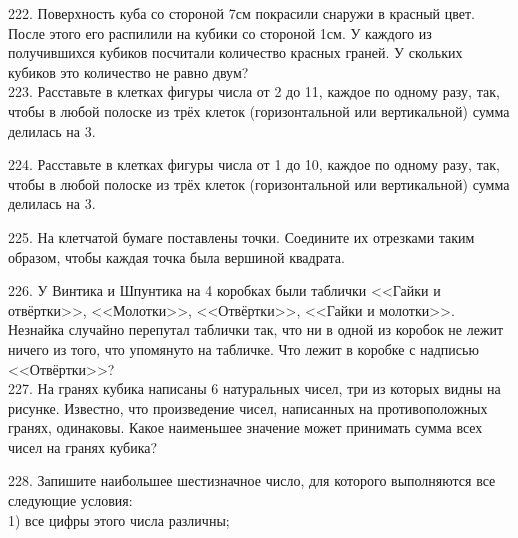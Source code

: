 222. Поверхность куба со стороной 7см покрасили снаружи в красный цвет. После этого его распилили на кубики со стороной 1см. У каждого из получившихся кубиков посчитали количество красных граней. У скольких кубиков это количество не равно двум?\\
223. Расставьте в клетках фигуры числа от 2 до 11, каждое по одному разу, так, чтобы в любой полоске из трёх клеток (горизонтальной или вертикальной) сумма делилась на 3.
\begin{center}
\begin{figure}[ht!]
\end{figure}
\end{center}
224. Расставьте в клетках фигуры числа от 1 до 10, каждое по одному разу, так, чтобы в любой полоске из трёх клеток (горизонтальной или вертикальной) сумма делилась на 3.
\begin{center}
\begin{figure}[ht!]
\end{figure}
\end{center}
225. На клетчатой бумаге поставлены точки. Соедините их отрезками таким образом, чтобы каждая точка была вершиной квадрата.
\begin{center}
\begin{figure}[ht!]
\end{figure}
\end{center}
226. У Винтика и Шпунтика на 4 коробках были таблички <<Гайки и отвёртки>>, <<Молотки>>, <<Отвёртки>>, <<Гайки и молотки>>. Незнайка случайно перепутал таблички так, что ни в одной из коробок не лежит ничего из того, что упомянуто на табличке. Что лежит в коробке с надписью <<Отвёртки>>?\\
227. На гранях кубика написаны 6 натуральных чисел, три из которых видны на рисунке. Известно, что произведение чисел, написанных на противоположных гранях, одинаковы. Какое наименьшее значение может принимать сумма всех чисел на гранях кубика?
\begin{center}
\begin{figure}[ht!]
\end{figure}
\end{center}
228. Запишите наибольшее шестизначное число, для которого выполняются все следующие условия:\\
1) все цифры этого числа различны;\\

